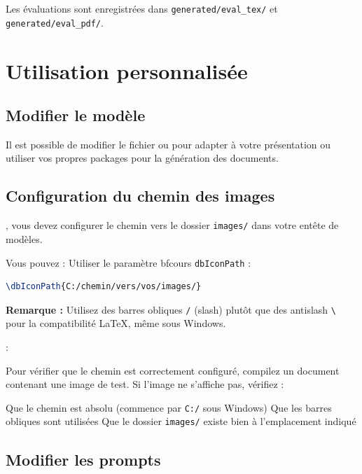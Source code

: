 Les évaluations sont enregistrées dans \texttt{generated/eval\_tex/} et \texttt{generated/eval\_pdf/}.

\section{Utilisation personnalisée}

\subsection{Modifier le modèle}

Il est possible de modifier le fichier  ou  pour adapter à votre présentation ou utiliser vos propres packages pour la génération des documents.

\subsection{Configuration du chemin des images}

, vous devez configurer le chemin vers le dossier \texttt{images/} dans votre entête de modèles.

Vous pouvez : Utiliser le paramètre bfcours \texttt{dbIconPath} :

\begin{lstlisting}[language=TeX]
\dbIconPath{C:/chemin/vers/vos/images/}
\end{lstlisting}

\textbf{Remarque :} Utilisez des barres obliques \texttt{/} (slash) plutôt que des antislash \texttt{\textbackslash} pour la compatibilité LaTeX, même sous Windows.

 :

Pour vérifier que le chemin est correctement configuré, compilez un document contenant une image de test. Si l'image ne s'affiche pas, vérifiez :
\begin{tcbenumerate}
    \tcbitem Que le chemin est absolu (commence par \texttt{C:/} sous Windows)
    \tcbitem Que les barres obliques sont utilisées
    \tcbitem Que le dossier \texttt{images/} existe bien à l'emplacement indiqué
\end{tcbenumerate}

\subsection{Modifier les prompts}


